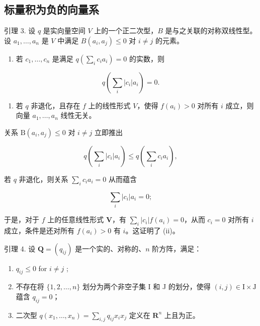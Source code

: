 \subsection{标量积为负的向量系}

引理 3. 设 \(q\) 是实向量空间 \(V\) 上的一个正二次型，\(B\) 是与之关联的对称双线性型。设 \(a_1, \ldots, a_n\) 是 \(V\) 中满足 \(B(a_i, a_j) \leqslant 0\) 对 \(i \neq j\) 的元素。

\begin{enumerate}
\def\labelenumi{(\roman{enumi})}
\tightlist
\item
若 \(c_{1}, \ldots, c_{n}\) 是满足 \(q\left(\sum_{i} c_{i} a_{i}\right) = 0\) 的实数，则
\end{enumerate}

\[
q \left(\sum_ {i} | c _ {i} | a _ {i}\right) = 0.
\]

\begin{enumerate}
\def\labelenumi{(\roman{enumi})}
\setcounter{enumi}{1}
\tightlist
\item
若 \(q\) 非退化，且存在 \(f\) 上的线性形式 \(V\)，使得 \(f(a_i) > 0\) 对所有 \(i\) 成立，则向量 \(a_1, \ldots, a_n\) 线性无关。
\end{enumerate}

关系 \(\mathrm{B}(a_i, a_j) \leqslant 0\) 对 \(i \neq j\) 立即推出

\[
q \left(\sum_ {i} | c _ {i} | a _ {i}\right) \leqslant q \left(\sum_ {i} c _ {i} a _ {i}\right),
\]

若 \(q\) 非退化，则关系 \(\sum_{i} c_{i} a_{i} = 0\) 从而蕴含

\[
\sum_ {i} | c _ {i} | a _ {i} = 0;
\]

于是，对于 \(f\) 上的任意线性形式 \(\mathbf{V}\)，有 \(\sum_{i}|c_i|f(a_i) = 0\)，从而 \(c_i = 0\) 对所有 \(i\) 成立，条件是还对所有 \(f(a_i) > 0\) 有 \(i\)。这证明了 (ii)。

引理 4. 设 \(\mathbf{Q} = (q_{ij})\) 是一个实的、对称的、\(n\) 阶方阵，满足：

\begin{enumerate}
\def\labelenumi{\alph{enumi})}
\item
  \(q_{ij} \leqslant 0\) for \(i \neq j\) ;
\item
不存在将 \(\{1,2,\ldots,n\}\) 划分为两个非空子集 I 和 J 的划分，使得 \((i,j)\in\mathrm{I}\times\mathrm{J}\) 蕴含 \(q_{ij}=0\)；
\item
二次型 \(q(x_{1},\ldots ,x_{n}) = \sum_{i,j}q_{ij}x_{i}x_{j}\) 定义在 \(\mathbf{R}^n\) 上且为正。
\end{enumerate}

